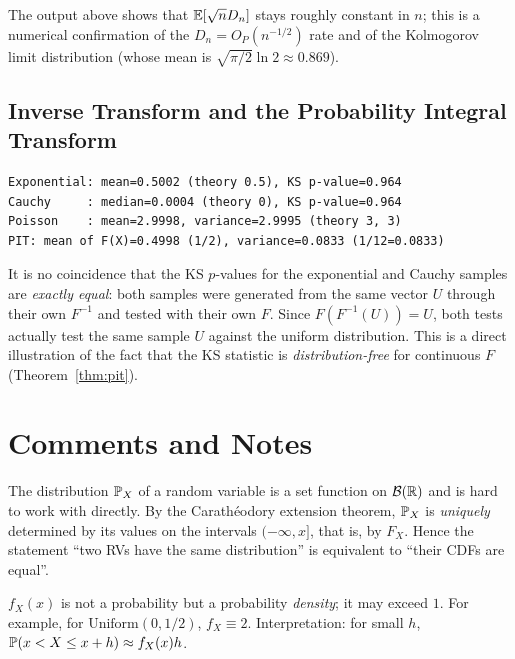 \documentclass[main.tex]{subfiles}
\begin{document}
The output above shows that $\E[\sqrt n D_n]$ stays roughly constant in $n$; this is a numerical confirmation of the $D_n=O_P(n^{-1/2})$ rate and of the Kolmogorov limit distribution (whose mean is $\sqrt{\pi/2}\ln 2\approx0.869$).

\subsection{Inverse Transform and the Probability Integral Transform}

\begin{lstlisting}[style=output]
Exponential: mean=0.5002 (theory 0.5), KS p-value=0.964
Cauchy     : median=0.0004 (theory 0), KS p-value=0.964
Poisson    : mean=2.9998, variance=2.9995 (theory 3, 3)
PIT: mean of F(X)=0.4998 (1/2), variance=0.0833 (1/12=0.0833)
\end{lstlisting}

It is no coincidence that the KS $p$-values for the exponential and Cauchy samples are \emph{exactly equal}: both samples were generated from the same vector $U$ through their own $F^{-1}$ and tested with their own $F$. Since $F(F^{-1}(U))=U$, both tests actually test the same sample $U$ against the uniform distribution. This is a direct illustration of the fact that the KS statistic is \emph{distribution-free} for continuous $F$ (Theorem~\ref{thm:pit}).

\section{Comments and Notes}

\begin{remark}
The distribution $\P_X$ of a random variable is a set function on $\B(\R)$ and is hard to work with directly. By the Carathéodory extension theorem, $\P_X$ is \emph{uniquely} determined by its values on the intervals $(-\infty,x]$, that is, by $F_X$. Hence the statement ``two RVs have the same distribution'' is equivalent to ``their CDFs are equal''.
\end{remark}

\begin{remark}
$f_X(x)$ is not a probability but a probability \emph{density}; it may exceed $1$. For example, for $\text{Uniform}(0,1/2)$, $f_X\equiv2$. Interpretation: for small $h$, $\P(x<X\le x+h)\approx f_X(x)h$.
\end{remark}
\end{document}
